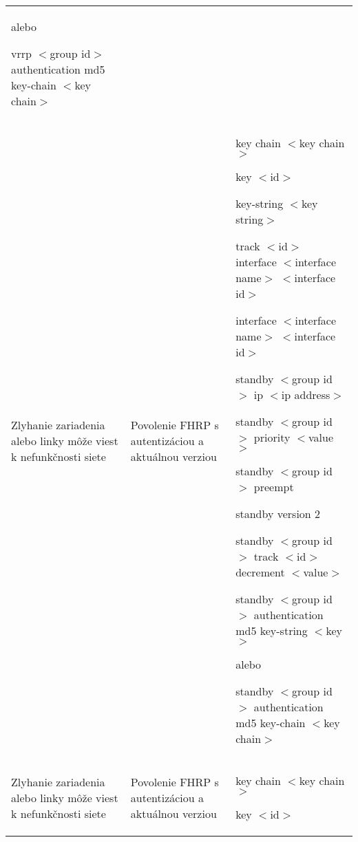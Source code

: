\begin{longtable}[!htbp]{|L{10em}L{10em}>{\selectfont}L{34em}|}
	\vspace{0.5em}
	{\selectfont alebo}
	\vspace{0.5em}
	
	\hspace{0.5em}vrrp $<$group id$>$ authentication md5 key-chain $<$key chain$>$\\
	
	
	 Zlyhanie zariadenia alebo linky môže viest k nefunkčnosti siete 	&Povolenie FHRP s autentizáciou a aktuálnou verziou	&key chain $<$key chain$>$
	
	\hspace{0.5em}key $<$id$>$
	
	\hspace{0.5em}key-string $<$key string$>$
	
	track $<$id$>$  interface $<$interface name$>$ $<$interface id$>$
	
	interface $<$interface name$>$ $<$interface id$>$
	
	\hspace{0.5em}standby $<$group id$>$ ip $<$ip address$>$
	
	\hspace{0.5em}standby $<$group id$>$ priority $<$value$>$
	
	\hspace{0.5em}standby $<$group id$>$ preempt
	
	\hspace{0.5em}standby version 2
	
	\hspace{0.5em}standby $<$group id$>$ track $<$id$>$ decrement $<$value$>$
	
	\hspace{0.5em}standby $<$group id$>$ authentication md5 key-string $<$key$>$
	
	\vspace{0.5em}
	{\selectfont alebo}
	\vspace{0.5em}
	
	\hspace{0.5em}standby $<$group id$>$ authentication md5 key-chain $<$key chain$>$\\	
	
	
	
	Zlyhanie zariadenia alebo linky môže viest k nefunkčnosti siete 	&Povolenie FHRP s autentizáciou a aktuálnou verziou	&key chain $<$key chain$>$
	
	\hspace{0.5em}key $<$id$>$
	

\end{longtable}

